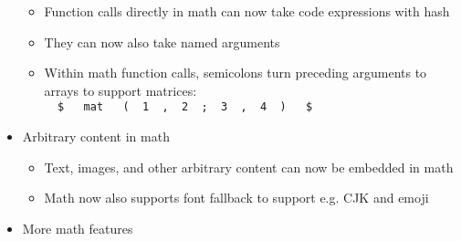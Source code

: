 \begin{itemize}
  \begin{itemize}
  \tightlist
  \item
    Function calls directly in math can now take code expressions with
    hash
  \item
    They can now also take named arguments
  \item
    Within math function calls, semicolons turn preceding arguments to
    arrays to support matrices:
    \texttt{\ }{\texttt{\ \$\ }}\texttt{\ }{\texttt{\ mat\ }}\texttt{\ }{\texttt{\ (\ }}\texttt{\ 1\ }{\texttt{\ ,\ }}\texttt{\ 2\ }{\texttt{\ ;\ }}\texttt{\ 3\ }{\texttt{\ ,\ }}\texttt{\ 4\ }{\texttt{\ )\ }}\texttt{\ }{\texttt{\ \$\ }}\texttt{\ }
  \end{itemize}
\item
  Arbitrary content in math

  \begin{itemize}
  \tightlist
  \item
    Text, images, and other arbitrary content can now be embedded in
    math
  \item
    Math now also supports font fallback to support e.g. CJK and emoji
  \end{itemize}
\item
  More math features


\end{itemize}
